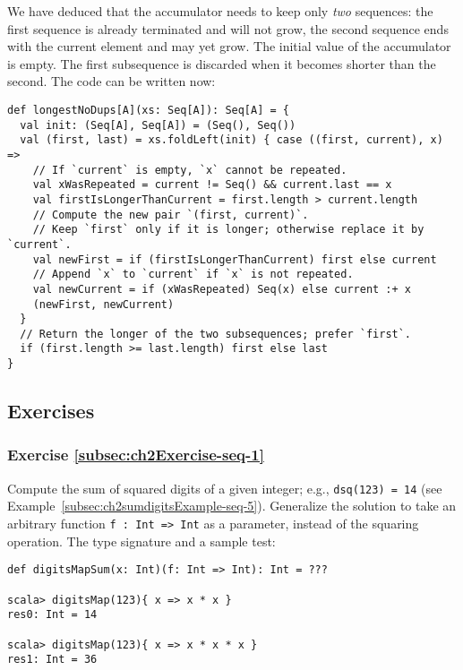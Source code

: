 We have deduced that the accumulator needs to keep only \emph{two}
sequences: the first sequence is already terminated and will not grow,
the second sequence ends with the current element and may yet grow.
The initial value of the accumulator is empty. The first subsequence
is discarded when it becomes shorter than the second. The code can
be written now:
\begin{lstlisting}
def longestNoDups[A](xs: Seq[A]): Seq[A] = {
  val init: (Seq[A], Seq[A]) = (Seq(), Seq())
  val (first, last) = xs.foldLeft(init) { case ((first, current), x) =>
    // If `current` is empty, `x` cannot be repeated.
    val xWasRepeated = current != Seq() && current.last == x
    val firstIsLongerThanCurrent = first.length > current.length
    // Compute the new pair `(first, current)`.
    // Keep `first` only if it is longer; otherwise replace it by `current`.
    val newFirst = if (firstIsLongerThanCurrent) first else current
    // Append `x` to `current` if `x` is not repeated.
    val newCurrent = if (xWasRepeated) Seq(x) else current :+ x
    (newFirst, newCurrent)
  }
  // Return the longer of the two subsequences; prefer `first`.
  if (first.length >= last.length) first else last
}
\end{lstlisting}

\subsection{Exercises}

\subsubsection{Exercise \label{subsec:ch2Exercise-seq-1}\ref{subsec:ch2Exercise-seq-1}}

Compute the sum of squared digits of a given integer; e.g., \lstinline!dsq(123) = 14!
(see Example~\ref{subsec:ch2sumdigitsExample-seq-5}). Generalize
the solution to take an arbitrary function \lstinline!f : Int => Int!
as a parameter, instead of the squaring operation. The type signature
and a sample test:
\begin{lstlisting}
def digitsMapSum(x: Int)(f: Int => Int): Int = ???

scala> digitsMap(123){ x => x * x }
res0: Int = 14

scala> digitsMap(123){ x => x * x * x }
res1: Int = 36
\end{lstlisting}


